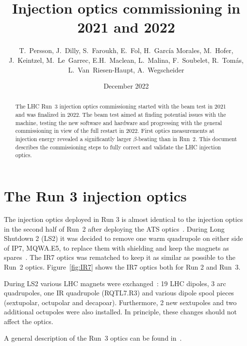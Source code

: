 \documentclass[a4paper]{cernatsnote}
\title{Injection optics commissioning in 2021 and 2022}
\author{ T.~Persson, J.~Dilly, S.~Faroukh, E.~Fol, H.~Garc\'ia Morales, M.~Hofer,
 J.~Keintzel, M.~Le~Garrec, E.H.~Maclean, L.~Malina,  F.~Soubelet, R.~Tom\'as, L.~Van~Riesen-Haupt,  A.~Wegscheider}
\date{December 2022}
\begin{document}
\maketitle
\begin{abstract}
The LHC Run~3 injection optics commissioning started with the beam test in 2021 and was finalized in 2022.
The beam test aimed at finding potential issues with the machine, testing the new software and hardware and progressing with the general commissioning in view of the full restart in 2022.
First optics measurements at injection energy revealed a significantly larger $\beta$-beating than in Run~2.
This document describes the commissioning steps to fully correct and validate the LHC injection optics.


\end{abstract}

\section{The Run 3 injection optics}
The injection optics deployed in Run 3 is almost identical to the injection optics in the second half of Run~2 after deploying the ATS optics~\cite{ats_stephane}.
During Long Shutdown 2 (LS2) it was decided to remove one warm quadrupole on either side of IP7, MQWA.E5, to replace them with shielding and keep the magnets as spares~\cite{roderik}. The IR7 optics was rematched to
keep it as similar as possible to the Run~2 optics. Figure~\ref{fig:IR7} shows the IR7 optics both for Run 2 and Run~3. 

During LS2 various LHC magnets were exchanged~\cite{LS2,LS2a}:
19 LHC dipoles,
3 arc quadrupoles, one IR quadrupole (RQTL7.R3) and various dipole spool pieces (sextupolar, octupolar and decapoar).
Furthermore, 2 new sextupoles and two additional octupoles were also installed.
In principle, these changes should not affect the optics.

A general description of the Run~3 optics can be found in~\cite{run3}.
\end{document}
